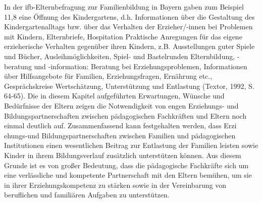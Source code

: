\documentclass[12pt,a4paper]{article}
\begin{document}
	In der ifb-Elternbefragung zur Familienbildung in Bayern gaben zum Beispiel 11,8%
 eine Öffnung des Kindergartens, d.h. Informationen über die Gestaltung des Kindergartenalltags bzw. über das Verhalten der Erzieher/-innen bei Problemen mit Kindern, Elternbriefe, Hospitation
 Praktische Anregungen für das eigene erzieherische Verhalten gegenüber ihren Kindern, z.B. Ausstellungen guter Spiele und Bücher, Ausleihmöglichkeiten, Spiel- und Bastelrunden
 Elternbildung, -beratung und -information: Beratung bei Erziehungsproblemen, Informationen  über Hilfsangebote für Familien, Erziehungsfragen, Ernährung  etc., Gesprächskreise
 Wertschätzung, Unterstützung und Entlastung (Textor, 1992, S. 64-65).
Die in diesem Kapitel aufgeführten Erwartungen, Wünsche und Bedürfnisse der Eltern zeigen die Notwendigkeit von engen Erziehungs- und Bildungspartnerschaften zwischen pädagogischen Fachkräften und Eltern noch einmal deutlich auf.
	Zusammenfassend kann festgehalten werden, dass Erzi ehungs-und Bildungspartnerschaften zwischen Familien und pädagogischen Institutionen einen wesentlichen Beitrag zur Entlastung der Familien leisten sowie Kinder in ihrem Bildungsverlauf zusätzlich unterstützen können. Aus diesem Grunde ist es von großer Bedeutung, dass die pädagogische Fachkräfte sich um eine verlässliche und kompetente Partnerschaft mit den Eltern bemühen, um sie in ihrer Erziehungskompetenz zu stärken sowie in der Vereinbarung von beruflichen und familiären Aufgaben zu unterstützen.
\end{document}

